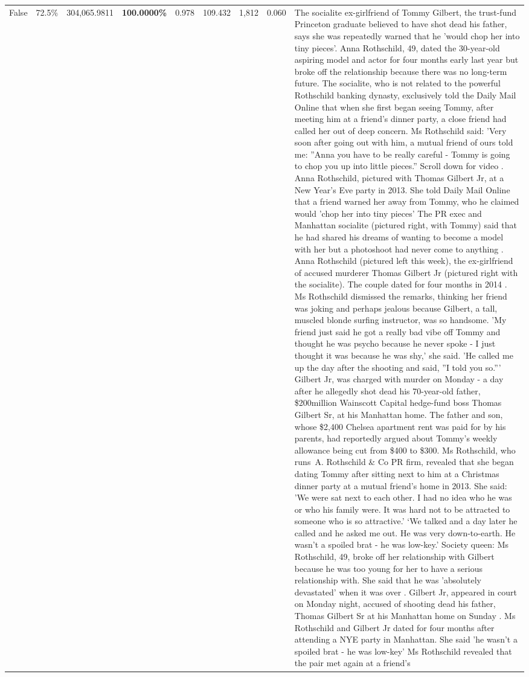 \begin{table}[H]
\begin{tabular}{lllrlllll}
False & 72.5\% & \color{red} 304,065.9811 & \bfseries \color{red} 100.0000\% & 0.978 & 109.432 & 1,812 & 0.060 & The socialite ex-girlfriend of Tommy Gilbert, the trust-fund Princeton graduate believed to have shot dead his father, says she was repeatedly warned that he 'would chop her into tiny pieces'. Anna Rothschild, 49, dated the 30-year-old aspiring model and actor for four months early last year but broke off the relationship because there was no long-term future. The socialite, who is not related to the powerful Rothschild banking dynasty, exclusively told the Daily Mail Online that when she first began seeing Tommy, after meeting him at a friend's dinner party, a close friend had called her out of deep concern. Ms Rothschild said: 'Very soon after going out with him, a mutual friend of ours told me: ''Anna you have to be really careful - Tommy is going to chop you up into little pieces.'' Scroll down for video . Anna Rothschild, pictured with Thomas Gilbert Jr, at a New Year's Eve party in 2013. She told Daily Mail Online that a friend warned her away from Tommy, who he claimed would 'chop her into tiny pieces' The PR exec and Manhattan socialite (pictured right, with Tommy) said that he had shared his dreams of wanting to become a model with her but a photoshoot had never come to anything . Anna Rothschild (pictured left this week), the ex-girlfriend of accused murderer Thomas Gilbert Jr (pictured right with the socialite). The couple dated for four months in 2014 . Ms Rothschild dismissed the remarks, thinking her friend was joking and perhaps jealous because Gilbert, a tall, muscled blonde surfing instructor, was so handsome. 'My friend just said he got a really bad vibe off Tommy and thought he was psycho because he never spoke - I just thought it was because he was shy,' she said. 'He called me up the day after the shooting and said, ''I told you so.''' Gilbert Jr, was charged with murder on Monday - a day after he allegedly shot dead his 70-year-old father, \$200million Wainscott Capital hedge-fund boss Thomas Gilbert Sr, at his Manhattan home. The father and son, whose \$2,400 Chelsea apartment rent was paid for by his parents, had reportedly argued about Tommy's weekly allowance being cut from \$400 to \$300. Ms Rothschild, who runs A. Rothschild \& Co PR firm, revealed that she began dating Tommy after sitting next to him at a Christmas dinner party at a mutual friend's home in 2013. She said: 'We were sat next to each other. I had no idea who he was or who his family were. It was hard not to be attracted to someone who is so attractive.' ‘We talked and a day later he called and he asked me out. He was very down-to-earth. He wasn’t a spoiled brat - he was low-key.’ Society queen: Ms Rothschild, 49, broke off her relationship with Gilbert because he was too young for her to have a serious relationship with. She said that he was 'absolutely devastated' when it was over . Gilbert Jr, appeared in court on Monday night, accused of shooting dead his father, Thomas Gilbert Sr at his Manhattan home on Sunday . Ms Rothschild and Gilbert Jr dated for four months after attending a NYE party in Manhattan. She said 'he wasn't a spoiled brat - he was low-key' Ms Rothschild revealed that the pair met again at a friend’s 
\end{tabular}
\end{table}
